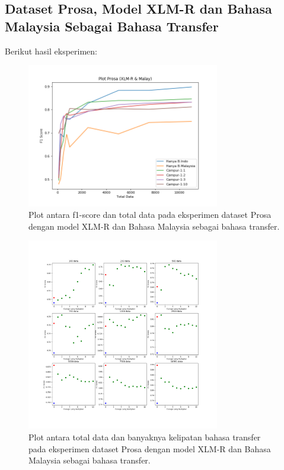     \subsection{Dataset Prosa, Model XLM-R dan Bahasa Malaysia Sebagai Bahasa Transfer}
        Berikut hasil eksperimen: 
        \begin{figure}[ht]
            \centering
            \includegraphics[width=0.75\textwidth]{resources/prosa-xlmr-malay-1.png}
            \caption{Plot antara f1-score dan total data pada eksperimen dataset Prosa dengan model XLM-R dan Bahasa Malaysia sebagai bahasa transfer.}

            \label{fig:prosa_xlmr_malay_1}
        \end{figure}

        \begin{figure}[ht]
            \centering
            \includegraphics[width=0.75\textwidth]{resources/prosa-xlmr-malay-2.png}
            \caption{Plot antara total data dan banyaknya kelipatan bahasa transfer pada eksperimen dataset Prosa dengan model XLM-R dan Bahasa Malaysia sebagai bahasa transfer.}

            \label{fig:prosa_xlmr_malay_2}
        \end{figure}

